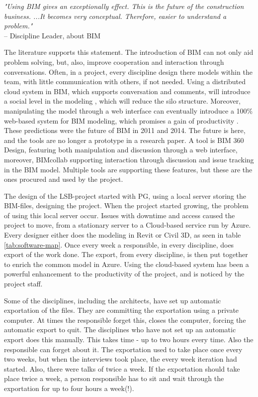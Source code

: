 \textit{"Using BIM gives an exceptionally effect. This is the future of the construction business. ...It becomes very conceptual. Therefore, easier to understand a problem."} \\
– Discipline Leader, about BIM

The literature supports this statement. The introduction of BIM can not only aid problem solving, but, also, improve cooperation and interaction through conversations. Often, in a project, every discipline design there models within the team, with little communication with others, if not needed. Using a distributed cloud system in BIM, which supports conversation and comments, will introduce a social level in the modeling \cite{das2014bimcloud}, which will reduce the silo structure. Moreover, manipulating the model through a web interface can eventually introduce a 100\% web-based system for BIM modeling, which promises a gain of productivity \cite{chuang2011applying}. These predictions were the future of BIM in 2011 and 2014. The future is here, and the tools are no longer a prototype in a research paper. A tool is BIM 360 Design, featuring both manipulation and discussion through a web interface, moreover, BIMcollab supporting interaction through discussion and issue tracking in the BIM model. Multiple tools are supporting these features, but these are the ones procured and used by the project. 

The design of the LSB-project started with PG, using a local server storing the BIM-files, designing the project. When the project started growing, the problem of using this local server occur. Issues with downtime and access caused the project to move, from a stationary server to a Cloud-based service run by Azure. Every designer either does the modeling in Revit or Civil 3D, as seen in table \ref{tab:software-map}. Once every week a responsible, in every discipline, does export of the work done. The export, from every discipline, is then put together to enrich the common model in Azure. Using the cloud-based system has been a powerful enhancement to the productivity of the project, and is noticed by the project staff. 

Some of the disciplines, including the architects, have set up automatic exportation of the files. They are committing the exportation using a private computer. At times the responsible forget this, closes the computer, forcing the automatic export to quit. The disciplines who have not set up an automatic export does this manually. This takes time - up to two hours every time. Also the responsible can forget about it. The exportation used to take place once every two weeks, but when the interviews took place, the every week iteration had started. Also, there were talks of twice a week. If the exportation should take place twice a week, a person responsible has to sit and wait through the exportation for up to four hours a week(!).

